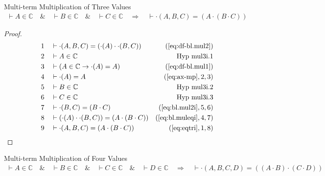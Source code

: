 \begin{lemma} Multi-term Multiplication of Three Values
\begin{align}
\vdash A \in \mathbb{C}\quad\&\quad \vdash B \in \mathbb{C}\quad\&\quad \vdash
    C \in \mathbb{C}\quad\Rightarrow\quad \vdash \cdot( A , B , C ) = ( A \cdot
    ( B \cdot C ) )\label{eq:bl.mul3i}\tag{bl.mul3i}
\end{align}
\end{lemma}

\begin{proof}
\begin{align}
  1 &&  & \vdash \cdot( A , B , C ) = ( \cdot( A ) \cdot \cdot( B , C ) )&(\mbox{\ref{eq:df-bl.mul2}})\notag
  \\ 2 &&  & \vdash A \in \mathbb{C}&\text{Hyp~mul3i.1}\notag%
  \\ 3 &&  & \vdash ( A \in \mathbb{C} \rightarrow \cdot( A ) = A )&(\mbox{\ref{eq:df-bl.mul1}})\notag
  \\ 4 &&  & \vdash \cdot( A ) = A&(\mbox{\ref{eq:ax-mp}},2,3)\notag
  \\ 5 &&  & \vdash B \in \mathbb{C}&\text{Hyp~mul3i.2}\notag%
  \\ 6 &&  & \vdash C \in \mathbb{C}&\text{Hyp~mul3i.3}\notag%
  \\ 7 &&  & \vdash \cdot( B , C ) = ( B \cdot C )&(\mbox{\ref{eq:bl.mul2i}},5,6)\notag
  \\ 8 &&  & \vdash ( \cdot( A ) \cdot \cdot( B , C ) ) = ( A \cdot ( B \cdot C ) )&(\mbox{\ref{eq:bl.muleqi}},4,7)\notag
  \\ 9 &&  & \vdash \cdot( A , B , C ) = ( A \cdot ( B \cdot C ) )&(\mbox{\ref{eq:eqtri}},1,8)\notag
\end{align}
\end{proof}

\begin{lemma} Multi-term Multiplication of Four Values
\begin{align}
\vdash A \in \mathbb{C}\quad\&\quad \vdash B \in \mathbb{C}\quad\&\quad \vdash
    C \in \mathbb{C}\quad\&\quad \vdash D \in \mathbb{C}\quad\Rightarrow\quad
    \vdash \cdot( A , B , C , D ) = ( ( A \cdot B ) \cdot ( C \cdot D )
    )\label{eq:bl.mul4i}\tag{bl.mul4i}
\end{align}
\end{lemma}

